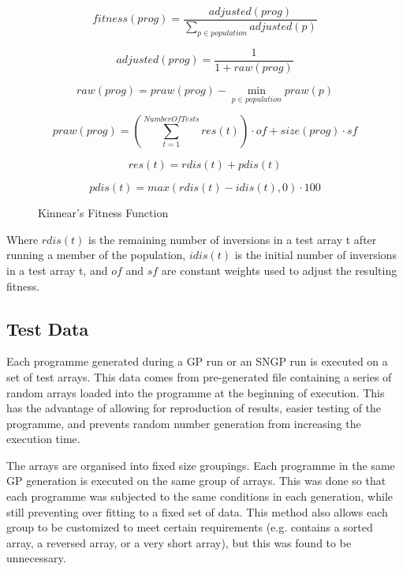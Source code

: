 \documentclass{article}
\begin{document}
        \begin{figure}[h]
            $$fitness(prog) = \frac{adjusted(prog)}{\sum_{p\in population}^{}adjusted(p)}$$
            
            $$adjusted(prog) = \frac{1}{1 + raw(prog)}$$
            
            $$raw(prog) = praw(prog) - \min_{p\in population} praw(p)$$
            
            $$praw(prog) = \left(\sum_{t = 1}^{Number Of Tests}res(t)\right) \cdot of + size(prog) \cdot sf$$
            
            $$res(t) = rdis(t) + pdis(t)$$
            
            $$pdis(t) = max(rdis(t) - idis(t), 0) \cdot 100$$
            
            \caption{Kinnear's Fitness Function}
            
            \label{kinnear_fitness}		
        
        \end{figure}
        Where $rdis(t)$ is the remaining number of inversions in a test array t after running a member of the population, $idis(t)$ is the initial number of inversions in a test array t, and $of$ and $sf$ are constant weights used to adjust the resulting fitness.

    \subsection{Test Data}
        
        Each programme generated during a GP run or an SNGP run is executed on a set of test arrays. This data comes from pre-generated file containing a series of random arrays loaded into the programme at the beginning of execution. This has the advantage of allowing for reproduction of results, easier testing of the programme, and prevents random number generation from increasing the execution time.
        
        The arrays are organised into fixed size groupings. Each programme in the same GP generation is executed on the same group of arrays. This was done so that each programme was subjected to the same conditions in each generation, while still preventing over fitting to a fixed set of data. This method also allows each group to be customized to meet certain requirements (e.g. contains a sorted array, a reversed array, or a very short array), but this was found to be unnecessary.
        
\end{document}
